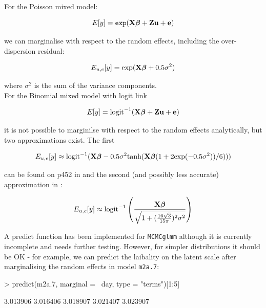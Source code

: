 \documentclass{article}
\begin{document}
For the Poisson mixed model:

\begin{equation}
E[y] = \texttt{exp}({\bf X}{\bm \beta}+{\bf Z}{\bf u}+{\bf e})
\end{equation}

we can marginalise with respect to the random effects, including the over-dispersion residual:

\begin{equation}
E_{{u,e}}[y] = \textrm{exp}({\bf X}{\bm \beta}+0.5\sigma^{2})
\end{equation}

where $\sigma^{2}$ is the sum of the variance components.\\

For the Binomial mixed model with logit link

\begin{equation}
E[y] = \textrm{logit}^{-1}({\bf X}{\bm \beta}+{\bf Z}{\bf u}+{\bf e})
\end{equation}

it is not possible to marginilse with respect to the random effects analytically, but two approximations exist. The first

\begin{equation}
E_{{u,e}}[y] \approx \textrm{logit}^{-1}({\bf X}{\bm \beta}-0.5\sigma^{2}\textrm{tanh}({\bf X}{\bm \beta}(1+2\textrm{exp}(-0.5\sigma^{2}))/6)))
\end{equation}

can be found on p452 in \citet{McCulloch.2001} and the second (and possibly less accurate) approximation in \citet{Diggle.2004}:


\begin{equation}
E_{{u,e}}[y] \approx \textrm{logit}^{-1}\left(\frac{{\bf X}{\bm \beta}}{\sqrt{1+(\frac{16\sqrt{3}}{15\pi})^{2}\sigma^{2}}}\right)
\end{equation}



A predict function has been implemented for \texttt{MCMCglmm} although it is currently incomplete and needs further testing. However, for simpler distributions it should be OK - for example, we can predict the laibality on the latent scale after marginalising the random effects in model \texttt{m2a.7}:

\begin{Schunk}
\begin{Sinput}
> predict(m2a.7, marginal = ~day, type = "terms")[1:5]
\end{Sinput}
\begin{Soutput}
[1] 3.013906 3.016406 3.018907 3.021407 3.023907
\end{Soutput}
\end{Schunk}
\end{document}
